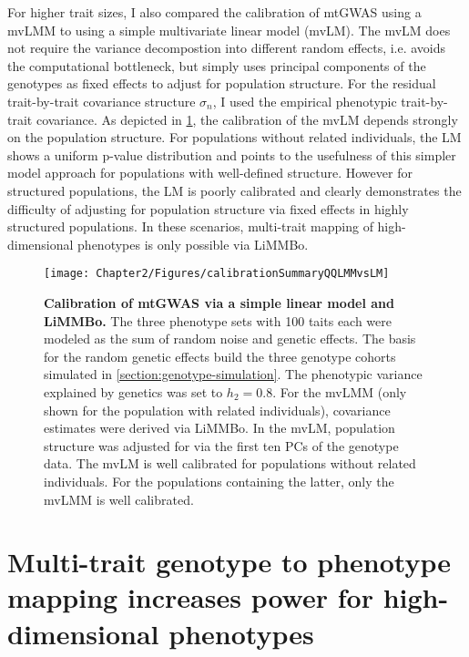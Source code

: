 For higher trait sizes, I also compared the calibration of mtGWAS using a mvLMM to using a simple multivariate linear model (mvLM). The mvLM does not require the variance decompostion into different random effects, i.e. avoids the computational bottleneck, but simply uses principal components of the genotypes as fixed effects to adjust for population structure. For the residual trait-by-trait covariance structure \(\sigma_n\), I used the empirical phenotypic trait-by-trait covariance. As depicted in \cref{fig:calibration-LM}, the calibration of the mvLM depends strongly on the population structure. For populations without related individuals, the LM shows a uniform p-value distribution and points to the usefulness of this simpler model approach for populations with well-defined structure. However for structured populations, the LM is poorly calibrated and clearly demonstrates the difficulty of adjusting for population structure via fixed effects in highly structured populations. In these scenarios, multi-trait mapping of high-dimensional phenotypes is only possible via LiMMBo. 
%
\begin{figure}[h!]
	\centering	
	\texttt{[image: Chapter2/Figures/calibrationSummaryQQLMMvsLM]}\\
	\caption[\textbf{Calibration of mtGWAS via a simple linear model and a linear mixed model. }]{\textbf{Calibration of mtGWAS via a simple linear model and LiMMBo. } The three phenotype sets with \num{100} taits each were modeled as the sum of random noise and genetic effects. The basis for the random genetic effects build the three genotype cohorts simulated in \cref{section:genotype-simulation}. The phenotypic variance explained by genetics was set to \(h_2=0.8\). For the mvLMM (only shown for the population with related individuals), covariance estimates were derived via LiMMBo. In the mvLM, population structure was adjusted for via the first ten PCs of the genotype data. The mvLM is well calibrated for populations without related individuals. For the populations containing the latter, only the mvLMM is well calibrated. }
	  \label{fig:calibration-LM}%
\end{figure}

\section{Multi-trait genotype to phenotype mapping increases power for high-dimensional phenotypes}
\label{section:power-limmbo}

